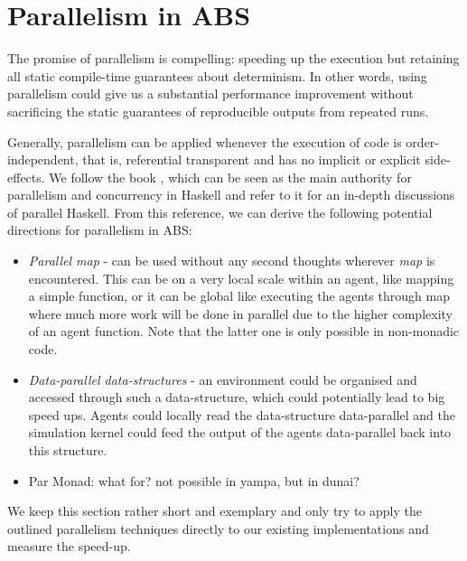 \section{Parallelism in ABS}
The promise of parallelism is compelling: speeding up the execution but retaining all static compile-time guarantees about determinism. In other words, using parallelism could give us a substantial performance improvement without sacrificing the static guarantees of reproducible outputs from repeated runs.

Generally, parallelism can be applied whenever the execution of code is order-independent, that is, referential transparent and has no implicit or explicit side-effects. We follow the book \cite{marlow_parallel_2013}, which can be seen as the main authority for parallelism and concurrency in Haskell and refer to it for an in-depth discussions of parallel Haskell. From this reference, we can derive the following potential directions for parallelism in ABS:

\begin{itemize}
	\item \textit{Parallel map} - can be used without any second thoughts wherever \textit{map} is encountered. This can be on a very local scale within an agent, like mapping a simple function, or it can be global like executing the agents through map where much more work will be done in parallel due to the higher complexity of an agent function. Note that the latter one is only possible in non-monadic code.
	
	\item \textit{Data-parallel data-structures} - an environment could be organised and accessed through such a data-structure, which could potentially lead to big speed ups. Agents could locally read the data-structure data-parallel and the simulation kernel could feed the output of the agents data-parallel back into this structure.
	
	\item Par Monad: what for? not possible in yampa, but in dunai?
\end{itemize}

We keep this section rather short and exemplary and only try to apply the outlined parallelism techniques directly to our existing implementations and measure the speed-up. 







